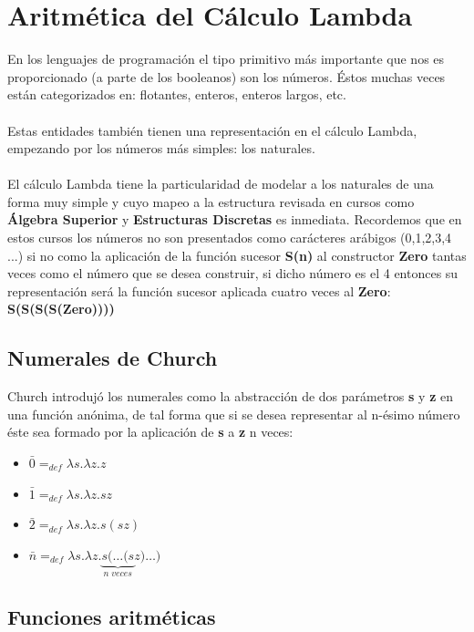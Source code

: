      \section{Aritmética del Cálculo Lambda}
        En los lenguajes de programación el tipo primitivo más importante que nos es proporcionado (a parte de los booleanos) son los números. Éstos muchas veces están categorizados en: flotantes, enteros, enteros largos, etc.\\\\
        Estas entidades también tienen una representación en el cálculo Lambda, empezando por los números más simples: los naturales.\\\\
        El cálculo Lambda tiene la particularidad de modelar a los naturales de una forma muy simple y cuyo mapeo a la estructura revisada en cursos como \textbf{Álgebra Superior} y \textbf{Estructuras Discretas} es inmediata. Recordemos que en estos cursos los números no son presentados como carácteres arábigos (0,1,2,3,4 ...) si no como la aplicación de la función sucesor \textbf{S(n)} al constructor \textbf{Zero} tantas veces como el número que se desea construir, si dicho número es el 4 entonces su representación será la función sucesor aplicada cuatro veces al \textbf{Zero}: \textbf{S(S(S(S(Zero))))}
        
     \subsection{Numerales de Church}
        Church introdujó los numerales como la abstracción de dos parámetros \textbf{s} y \textbf{z} en una función anónima, de tal forma que si se desea representar al n-ésimo número éste sea formado por la aplicación de \textbf{s} a \textbf{z} n veces:

    \begin{itemize}
        \item $\bar{0}=_{def}\lambda s.\lambda z.z$
        \item $\bar{1}=_{def}\lambda s.\lambda z.sz$
        \item $\bar{2}=_{def}\lambda s.\lambda z.s(sz)$
        \item $\bar{n}=_{def}\lambda s.\lambda z.\underbrace{s(\ldots(s}_{n\;veces} z)\ldots)$
    \end{itemize}

    \subsection{Funciones aritméticas}

